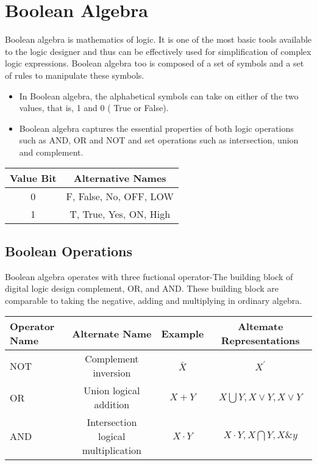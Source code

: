 \section{Boolean Algebra}
Boolean algebra is mathematics of logic. It is one of the most basic tools available to the logic designer and thus can be effectively used for simplification of complex logic expressions. Boolean algebra too is composed of a set of symbols and a set of rules to manipulate these symbols.
\begin{itemize}
	\item In Boolean
	algebra, the alphabetical symbols can take on either of the two values, that is, 1 and 0 ( True or False).
	\item Boolean algebra captures the essential properties of both logic operations such as AND, OR and NOT and set operations such as intersection, union and complement.
\end{itemize}
\begin{center}
	\renewcommand*{\arraystretch}{1.2}
	\begin{tabular}{|c|c|}
		\hline
		Value Bit&Alternative Names\\
		\hline
		0&F, False, No, OFF, LOW\\
		\hline
		1&T, True, Yes, ON, High\\
		\hline
	\end{tabular}
\end{center}

\subsection{Boolean Operations}
Boolean algebra operates with three fuctional operator-The building block of digital logic design complement, OR, and AND. These building block are comparable to taking the negative, adding and multiplying in ordinary algebra.
\begin{table}[H]
	\begin{center}
		\begin{tabular}{|l|c|c|c|}
			\hline Operator Name & Alternate Name & Example & Altemate Representations \\
			\hline \hline NOT & Complement inversion & $\bar{X}$ & $X^{\prime}$ \\
			\hline OR & Union logical addition & $X+Y$ & $X \bigcup Y, X \vee Y, X \vee Y$ \\
			\hline AND & Intersection logical multiplication & $X\cdot Y$ & $X \cdot Y, X \bigcap Y, X \& y$ \\
			\hline
		\end{tabular}
	\end{center}
	
\end{table}



